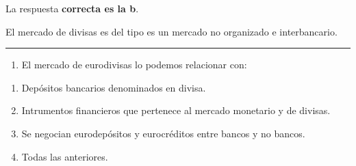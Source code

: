 \documentclass[
  letterpaper,
  DIV=11,
  numbers=noendperiod]{scrreprt}
\providecommand{\tightlist}{%
  \setlength{\itemsep}{0pt}\setlength{\parskip}{0pt}}\usepackage{longtable,booktabs,array}
\begin{document}
\begin{tcolorbox}[enhanced jigsaw, left=2mm, opacityback=0, colback=white, breakable, arc=.35mm, bottomrule=.15mm, rightrule=.15mm, toprule=.15mm, leftrule=.75mm, colframe=quarto-callout-tip-color-frame]
\begin{minipage}[t]{5.5mm}
\textcolor{quarto-callout-tip-color}{\faLightbulb}
\end{minipage}%
\begin{minipage}[t]{\textwidth - 5.5mm}

La respuesta \textbf{correcta es la b}.

El mercado de divisas es del tipo es un mercado no organizado e
interbancario.

\end{minipage}%
\end{tcolorbox}

\begin{center}\rule{0.5\linewidth}{0.5pt}\end{center}

\begin{enumerate}
\def\labelenumi{\arabic{enumi}.}
\setcounter{enumi}{7}
\tightlist
\item
  El mercado de eurodivisas lo podemos relacionar con:
\end{enumerate}

\begin{enumerate}
\def\labelenumi{\alph{enumi})}
\item
  Depósitos bancarios denominados en divisa.
\item
  Intrumentos financieros que pertenece al mercado monetario y de
  divisas.
\item
  Se negocian eurodepósitos y eurocréditos entre bancos y no bancos.
\item
  Todas las anteriores.
\end{enumerate}
\end{document}
